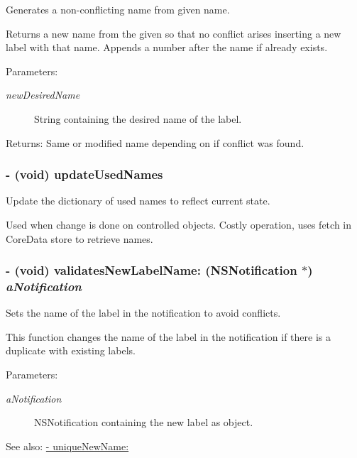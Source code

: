 Generates a non-conflicting name from given name. 

Returns a new name from the given so that no conflict arises inserting a new label with that name. Appends a number after the name if already exists. \begin{Desc}
\item[Parameters:]
\begin{description}
\item[{\em newDesiredName}]String containing the desired name of the label. \end{description}
\end{Desc}
\begin{Desc}
\item[Returns:]Same or modified name depending on if conflict was found. \end{Desc}
\hypertarget{interface_z_x_label_controller_f3fb09172b4b1ba2bc6ca4a0317ed201}{
\subsubsection[{updateUsedNames}]{\setlength{\rightskip}{0pt plus 5cm}- (void) updateUsedNames }}
\label{interface_z_x_label_controller_f3fb09172b4b1ba2bc6ca4a0317ed201}


Update the dictionary of used names to reflect current state. 

Used when change is done on controlled objects. Costly operation, uses fetch in CoreData store to retrieve names. \hypertarget{interface_z_x_label_controller_50d77144c9045b2f125604b699d474fb}{
\subsubsection[{validatesNewLabelName:}]{\setlength{\rightskip}{0pt plus 5cm}- (void) validatesNewLabelName: (NSNotification $\ast$) {\em aNotification}}}
\label{interface_z_x_label_controller_50d77144c9045b2f125604b699d474fb}


Sets the name of the label in the notification to avoid conflicts. 

This function changes the name of the label in the notification if there is a duplicate with existing labels. \begin{Desc}
\item[Parameters:]
\begin{description}
\item[{\em aNotification}]NSNotification containing the new label as object. \end{description}
\end{Desc}
\begin{Desc}
\item[See also:]\hyperlink{interface_z_x_label_controller_e223bf8f8bc63f53f0790b34050fee97}{- uniqueNewName:} \end{Desc}


